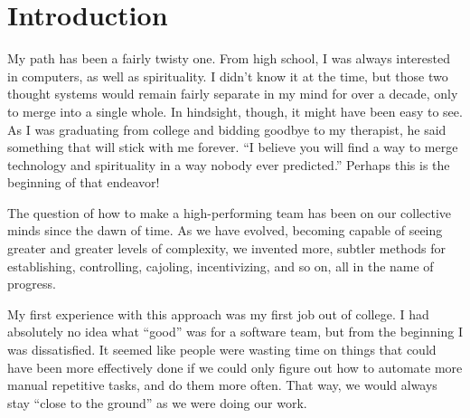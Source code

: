 \chapter{Introduction}

My path has been a fairly twisty one. From high school, I was always interested in computers, as well as
spirituality. I didn't know it at the time, but those two thought systems would remain fairly separate in my mind
for over a decade, only to merge into a single whole. In hindsight, though, it might have been easy to see. As I 
was graduating from college and bidding goodbye to my therapist, he said something that will stick with me 
forever. ``I believe you will find a way to merge technology and spirituality in a way nobody ever predicted.'' 
Perhaps this is the beginning of that endeavor!

The question of how to make a high-performing team has been on our collective minds since the dawn of time.
As we have evolved, becoming capable of seeing greater and greater levels of complexity, we invented
more, subtler methods for establishing, controlling, cajoling, incentivizing, and so on, all in the name of progress.

My first experience with this approach was my first job out of college. I had absolutely no idea what ``good''
was for a software team, but from the beginning I was dissatisfied. It seemed like people were wasting time on 
things that could have been more effectively done if we could only figure out how to automate more manual
repetitive tasks, and do them more often. That way, we would always stay ``close to the ground'' as we were
doing our work.